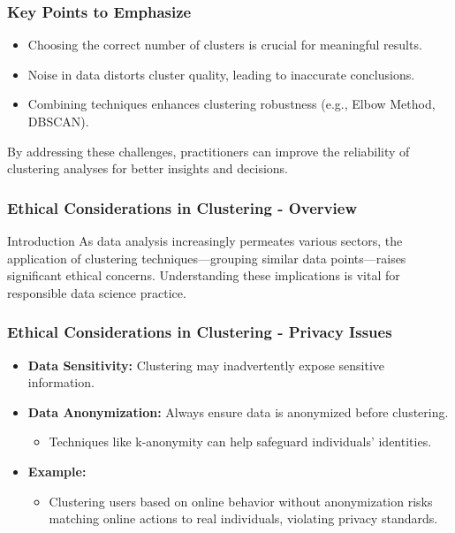 \documentclass{beamer}
\begin{document}
\begin{frame}[fragile]
    \frametitle{Key Points to Emphasize}
    \begin{itemize}
        \item Choosing the correct number of clusters is crucial for meaningful results.
        \item Noise in data distorts cluster quality, leading to inaccurate conclusions.
        \item Combining techniques enhances clustering robustness (e.g., Elbow Method, DBSCAN).
    \end{itemize}
    By addressing these challenges, practitioners can improve the reliability of clustering analyses for better insights and decisions.
\end{frame}

\begin{frame}[fragile]
    \frametitle{Ethical Considerations in Clustering - Overview}
    \begin{block}{Introduction}
        As data analysis increasingly permeates various sectors, the application of clustering techniques—grouping similar data points—raises significant ethical concerns. Understanding these implications is vital for responsible data science practice.
    \end{block}
\end{frame}

\begin{frame}[fragile]
    \frametitle{Ethical Considerations in Clustering - Privacy Issues}
    \begin{itemize}
        \item \textbf{Data Sensitivity:} Clustering may inadvertently expose sensitive information. 
        \item \textbf{Data Anonymization:} Always ensure data is anonymized before clustering.
            \begin{itemize}
                \item Techniques like k-anonymity can help safeguard individuals’ identities.
            \end{itemize}
        \item \textbf{Example:} 
            \begin{itemize}
                \item Clustering users based on online behavior without anonymization risks matching online actions to real individuals, violating privacy standards.
            \end{itemize}
    \end{itemize}    
\end{frame}
\end{document}
